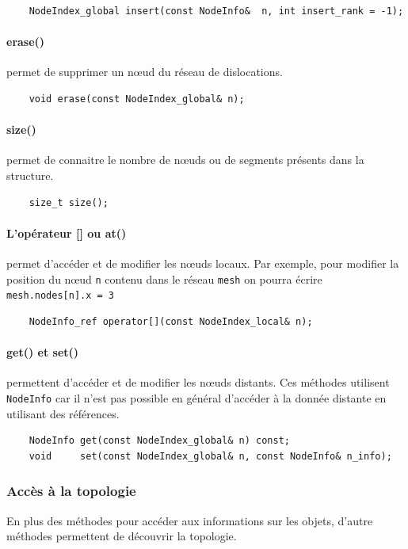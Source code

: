 \begin{verbatim}
	NodeIndex_global insert(const NodeInfo&  n, int insert_rank = -1);
\end{verbatim}

\paragraph{erase()} permet de supprimer un nœud du réseau de dislocations. 
\begin{verbatim}
	void erase(const NodeIndex_global& n);
\end{verbatim}

\paragraph{size()} permet de connaitre le nombre de nœuds ou de segments présents dans la structure.
\begin{verbatim}
	size_t size();
\end{verbatim}

\paragraph{L'opérateur [] ou at()} permet d'accéder et de modifier les nœuds locaux. Par exemple, pour modifier la position du nœud \verb|n| contenu dans le réseau \verb|mesh| on pourra écrire \verb|mesh.nodes[n].x = 3|
\begin{verbatim}
	NodeInfo_ref operator[](const NodeIndex_local& n);
\end{verbatim}

\paragraph{get() et set()} permettent d'accéder et de modifier les nœuds distants. Ces méthodes utilisent \verb|NodeInfo| car il n'est pas possible en général d'accéder à la donnée distante en utilisant des références.
\begin{verbatim}
	NodeInfo get(const NodeIndex_global& n) const;
	void     set(const NodeIndex_global& n, const NodeInfo& n_info);
\end{verbatim}

\subsubsection{Accès à la topologie}

En plus des méthodes pour accéder aux informations sur les objets, d'autre méthodes permettent de découvrir la topologie.

